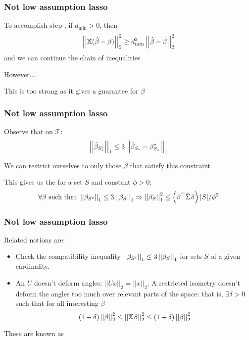\documentclass[12pt]{beamer}
\begin{document}
  \begin{frame}
  \frametitle{Not low assumption lasso}
To accomplish step , if $d_{\min} > 0$, then 
\[
\left|\left| \mathbb{X}(\hat\beta - \beta) \right|\right|_2^2 \geq d_{\min}^2\left|\left| \hat\beta - \beta \right|\right|_2^2
\]
and we can continue the chain of inequalities

\vsp
However...
\vsp


\vsp
 This  is too strong  as it gives a guarantee for  $\beta$
%
\end{frame}

  \begin{frame}
  \frametitle{Not low assumption lasso}
Observe that on $\mathcal{T}$:
\[
\left|\left| \hat{\beta}_{S_*^c} \right|\right|_1
\leq
3\left|\left| \hat{\beta}_{S_*} - \beta_{S_*}^* \right|\right|_1
\]

\vsp
We can restrict ourselves to only those $\beta$ that satisfy this constraint

\vsp
This gives us the  for a set $S$ and constant $\phi>0$:
\[
\forall \beta \textrm{ such that } \left|\left| \beta_{S^c} \right|\right|_1 \leq 3\left|\left| \beta_{S} \right|\right|_1
\Rightarrow
\left|\left| \beta_{S} \right|\right|_1^2 \leq \left(\beta^{\top} \hat\Sigma \beta \right) |S|/\phi^2
\]
\end{frame}

  \begin{frame}
  \frametitle{Not low assumption lasso}
Related notions are:
\begin{itemize}
\item {} Check the compatibility inequality $ \left|\left| \beta_{S^c} \right|\right|_1 \leq 3\left|\left| \beta_{S} \right|\right|_1$ for  sets $S$ of a given cardinality.
\item  {} An  $U$ doesn't deform angles: $|| Ux ||_2 = ||x||_2$.  
A restricted isometry doesn't deform the angles too much over relevant parts of the space: that is, $\exists \delta >0$ such that for all interesting $\beta$
\[
(1-\delta)\left|\left| \beta \right|\right|_2^2 \leq \left|\left| \mathbb{X}\beta \right|\right|_2^2 \leq (1+\delta)\left|\left| \beta \right|\right|_2^2
\]

\end{itemize}
\vsp

These are known as 
\end{frame}
\end{document}
